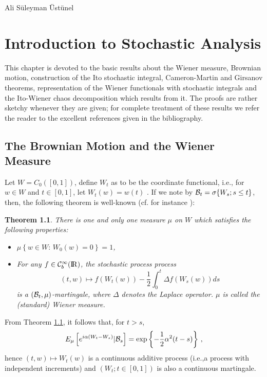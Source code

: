 \documentclass[12pt,a4paper]{book}
\newtheorem{theorem}{Theorem}[section]
\newcommand{\calB}{{\cal B}}
\newcommand{\calC}{{\cal C}}
\newcommand{\R}{{\rm I\!R}}
\begin{document}
\hspace*{9cm}Ali S\"uleyman  \"Ust\"unel

\tableofcontents
\newpage
{}
\setcounter{page}{1}
\chapter{Introduction to Stochastic Analysis}
\label{ch.intro}

This chapter is devoted to the basic results about the Wiener measure,
 Brownian motion, construction of the Ito stochastic integral,
 Cameron-Martin and Girsanov theorems,
 representation of the Wiener functionals with stochastic integrals  and the
 Ito-Wiener chaos decomposition which results from it. The proofs are
 rather sketchy whenever they are given; for complete treatment of
 these results  we refer the reader to the excellent references given
 in the bibliography.

\section{The Brownian Motion and the Wiener Measure}

Let $W=C_0([0,1])$, define $W_t$ as to be the
coordinate functional, i.e., for $w\in W$ and  $t\in[0,1]$, let  $W_t(w)=w(t)$
. If we note by
${\calB}_t=\sigma\{W_s;s\leq t\}$,
then, the following  theorem is well-known (cf. for instance \cite{S-V}):
\begin{theorem}
\label{wiener-thm}
There is one and only one  measure $\mu$
 on $W$ which satisfies the following
properties:  
\index[not]{b@${\calB}_t$}
\begin{itemize}
\item[i)]
$\mu\left\{w\in W:\,W_0(w)=0\right\}=1$,
\item[ii)]
For any  $ f\in{\calC}_b^\infty(\R)$, the stochastic process  process
$$
(t,w)\mapsto f(W_t(w))-\frac{1}{2}\int_0^t
\Delta f(W_s(w))ds
$$
is a $({\calB}_t,\mu)$-martingale, where $\Delta$ denotes the Laplace
operator. $\mu$ is called the (standard)  Wiener measure.
\end{itemize}
\end{theorem}

\noindent
From Theorem \ref{wiener-thm}, it follows  that, for $t>s$,
$$
E_\mu\left[e^{i\alpha(W_t-W_s)}|{\calB}_s\right]=
\exp\left\{-\frac{1}{2}\alpha^2(t-s)\right\}\,,
$$
 hence $(t,w)\mapsto W_t(w)$ is  a continuous additive process (i.e.,a
 process  with independent increments) and  $(W_t;t\in [0,1])$ is
 also a continuous martingale. 
\end{document}
